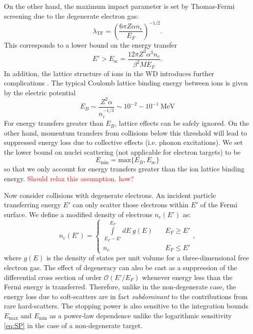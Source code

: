 \documentclass[twocolumn,showpacs,preprintnumbers,amsmath,amssymb,prd]{revtex4}
\def\r{\right)}
\def\l{\left(}
\begin{document}
\begin{appendices}
On the other hand, the maximum impact parameter is set by Thomas-Fermi screening due to the degenerate electron gas:
\begin{equation}
\label{eq:TF}
\lambda_{\text{TF}} = \l \frac{6 \pi Z \alpha n_e}{E_F}\r^{-1/2}.
\end{equation}
This corresponds to a lower bound on the energy transfer
\begin{equation}
E' > E_{\text{sc}} = \frac{12 \pi Z^3 \alpha ^3 n_e}{\beta^2 M E_F}.
\end{equation}
In addition, the lattice structure of ions in the WD introduces further complications \cite{Teukolsky}. The typical Coulomb lattice binding energy between ions is given by the electric potential
\begin{equation}
\label{eq:lattice}
E_B \sim \frac{Z^2 \alpha}{n_i^{-1/3}} \sim 10^{-2} - 10^{-1} ~\text{MeV}
\end{equation}
For energy transfers greater than $E_B$, lattice effects can be safely ignored. On the other hand, momentum transfers from collisions below this threshold will lead to suppressed energy loss due to collective effects (i.e. phonon excitations). We set the lower bound on nuclei scattering (not applicable for electron targets) to be
\begin{equation}
E_{\text{min}} = \text{max} \{E_B,E_{\text{sc}}\}
\end{equation}
so that we only account for energy transfers greater than the ion lattice binding energy. \textcolor{red}{Should relax this assumption. how?}

Now consider collisions with degenerate electrons. An incident particle transferring energy $E'$ can only scatter those electrons within $E'$ of the Fermi surface. We define a modified density of electrons $n_e(E')$ as:
\begin{equation}
\label{pauli}
n_e(E') = \left\{
        \begin{array}{ll}
            \displaystyle \int \limits_{E_F -E'}^{E_F}dE ~g(E) & \quad E_F \geq E' \\
            n_e & \quad E_F \leq E'
        \end{array}
    \right.,
\end{equation}
where $g(E)$ is the density of states per unit volume for a three-dimensional free electron gas. The effect of degeneracy can also be cast as a suppression of the differential cross section of order $\mathcal{O}(E'/E_F)$ whenever energy less than the Fermi energy is transferred. Therefore, unlike in the non-degenerate case, the energy loss due to soft-scatters are in fact \emph{subdominant} to the contributions from rare hard-scatters. The stopping power is also sensitive to the integration bounds $E_{\text{max}}$ and $E_{\text{min}}$ as a power-law dependence unlike the logarithmic sensitivity \eqref{eq:SP} in the case of a non-degenerate target.


\end{appendices}
\end{document}
